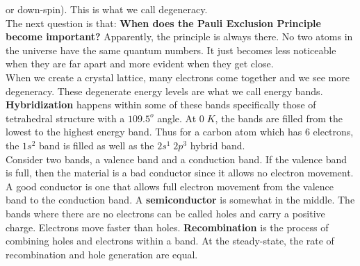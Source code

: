 \documentclass{article}
\begin{document}
or down-spin). This is what we call degeneracy.
\vspace{8pt}
\\The next question is that: \textbf{When does the Pauli Exclusion Principle become 
important?} Apparently, the principle is always there. No two atoms in the universe have 
the same quantum numbers. It just becomes less noticeable when they are far apart and
more evident when they get close. 
\vspace{8pt}
\\ When we create a crystal lattice, many electrons come together and we see more 
degeneracy. These degenerate energy levels are what we call energy bands. 
\textbf{Hybridization} happens within some of these bands specifically those of 
tetrahedral structure with a $109.5^{o}$ angle. At $0\;K$, the bands are filled from  
the lowest to the highest energy band. Thus for a carbon atom which has 6 electrons,
the $1s^2$ band is filled as well as the $2s^{1}\; 2p^{3}$ hybrid band. 
\vspace{8pt}
\\ Consider two bands, a valence band and a conduction band. If the valence band is full,
then the material is a bad conductor since it allows no electron movement. A good conductor 
is one that allows full electron movement from the valence band to the conduction band.
A \textbf{semiconductor} is somewhat in the middle. The bands where there are no 
electrons can be called holes and carry a positive charge. Electrons move faster than
holes. \textbf{Recombination} is the process of combining holes and electrons within
a band. At the steady-state, the rate of recombination and hole generation are equal.
\end{document}
